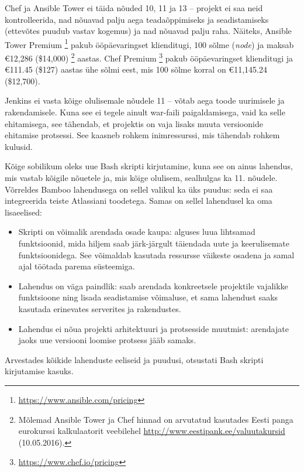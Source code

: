 \documentclass[12pt]{article}
\begin{document}
  Chef ja Ansible Tower ei täida nõuded 10, 11 ja 13 \--- projekt ei saa neid kontrolleerida, nad nõuavad palju aega teadaõppimiseks ja seadistamiseks (ettevõtes puudub vastav kogemus) ja nad nõuavad palju raha. Näiteks, Ansible Tower Premium \footnote{\url{https://www.ansible.com/pricing}} pakub ööpäevaringset klienditugi, 100 sõlme (\textit{node}) ja maksab \euro 12,286 (\$14,000) \footnote{Mõlemad Ansible Tower ja Chef hinnad on arvutatud kasutades Eesti panga eurokurssi kalkulaatorit veebilehel \url{http://www.eestipank.ee/valuutakursid} (10.05.2016).} aastas. Chef Premium \footnote{\url{https://www.chef.io/pricing}} pakub ööpäevaringset klienditugi ja \euro 111.45 (\$127) aastas ühe sõlmi eest, mis 100 sõlme korral on \euro 11,145.24 (\$12,700).
  
  Jenkins ei vasta kõige olulisemale nõudele 11 \--- võtab aega toode uurimisele ja rakendamisele. Kuna see ei tegele ainult war\--faili paigaldamisega, vaid ka selle ehitamisega, see tähendab, et projektis on vaja lisaks muuta versioonide ehitamise protsessi. See kaasneb rohkem inimressurssi, mis tähendab rohkem kulusid.
  
  \newpage
  
  Kõige sobilikum oleks uue Bash skripti kirjutamine, kuna see on ainus lahendus, mis vastab kõigile nõuetele ja, mis kõige olulisem, sealhulgas ka 11. nõudele. Võrreldes Bamboo lahendusega on sellel valikul ka üks puudus: seda ei saa integreerida teiste Atlassiani toodetega. Samas on sellel lahendusel ka oma lisaeelised:
  \begin{itemize}
    \item Skripti on võimalik arendada osade kaupa: alguses luua lihtsamad funktsioonid, mida hiljem saab järk-järgult täiendada uute ja keerulisemate funktsioonidega. See võimaldab kasutada ressursse väikeste osadena ja samal ajal töötada parema süsteemiga.
    \item Lahendus on väga paindlik: saab arendada konkreetsele projektile vajalikke funktsioone ning lisada seadistamise võimaluse, et sama lahendust saaks kasutada erinevates serverites ja rakendustes.
    \item Lahendus ei nõua projekti arhitektuuri ja protsesside muutmist: arendajate jaoks uue versiooni loomise protsess jääb samaks.
  \end{itemize}
  
  Arvestades kõikide lahenduste eeliseid ja puudusi, otsustati Bash skripti kirjutamise kasuks.
  
  \newpage
  
\end{document}
